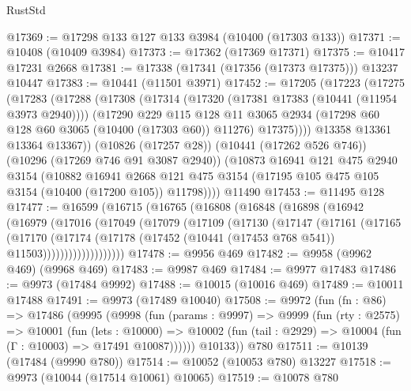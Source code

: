 \begin{lexlean}{RustStd}
\begin{coremodule}
@17369 := @17298 @133 @127 @133 @3984 (@10400 (@17303 @133))
@17371 := @10408 (@10409 @3984)
@17373 := @17362 (@17369 @17371)
@17375 := @10417 @17231 @2668
@17381 := @17338 (@17341 (@17356 (@17373 @17375))) @13237 @10447
@17383 := @10441 (@11501 @3971)
@17452 := @17205
    (@17223
      (@17275
        (@17283
          (@17288
            (@17308
              (@17314
                (@17320 (@17381 @17383 (@10441 (@11954 @3973 @2940))))
                (@17290
                  @229
                  @115
                  @128
                  @11
                  @3065
                  @2934
                  (@17298 @60 @128 @60 @3065 (@10400 (@17303 @60)) @11276)
                  @17375))))
          @13358
          @13361
          @13364
          @13367))
      (@10826 (@17257 @28))
      (@10441 (@17262 @526 @746))
      (@10296 (@17269 @746 @91 @3087 @2940))
      (@10873
        @16941
        @121
        @475
        @2940
        @3154
        (@10882
          @16941
          @2668
          @121
          @475
          @3154
          (@17195 @105 @475 @105 @3154 (@10400 (@17200 @105)) @11798))))
    @11490
@17453 := @11495 @128
@17477 := @16599
    (@16715
      (@16765
        (@16808
          (@16848
            (@16898
              (@16942
                (@16979
                  (@17016
                    (@17049
                      (@17079
                        (@17109
                          (@17130
                            (@17147
                              (@17161
                                (@17165
                                  (@17170
                                    (@17174
                                      (@17178
                                        (@17452
                                          (@10441 (@17453 @768 @541))
                                          @11503)))))))))))))))))))
@17478 := @9956 @469
@17482 := @9958 (@9962 @469) (@9968 @469)
@17483 := @9987 @469
@17484 := @9977 @17483
@17486 := @9973 (@17484 @9992)
@17488 := @10015 (@10016 @469)
@17489 := @10011 @17488
@17491 := @9973 (@17489 @10040)
@17508 := @9972
    (fun (fn : @86) =>
    @17486
      (@9995
        (@9998
          (fun (params : @9997) =>
          @9999
            (fun (rty : @2575) =>
            @10001
              (fun (lets : @10000) =>
              @10002 (fun (tail : @2929) => @10004 (fun (Γ : @10003) => @17491 @10087))))))
        @10133))
    @780
@17511 := @10139 (@17484 (@9990 @780))
@17514 := @10052 (@10053 @780) @13227
@17518 := @9973 (@10044 (@17514 @10061) @10065)
@17519 := @10078 @780

\end{coremodule}
\end{lexlean}
